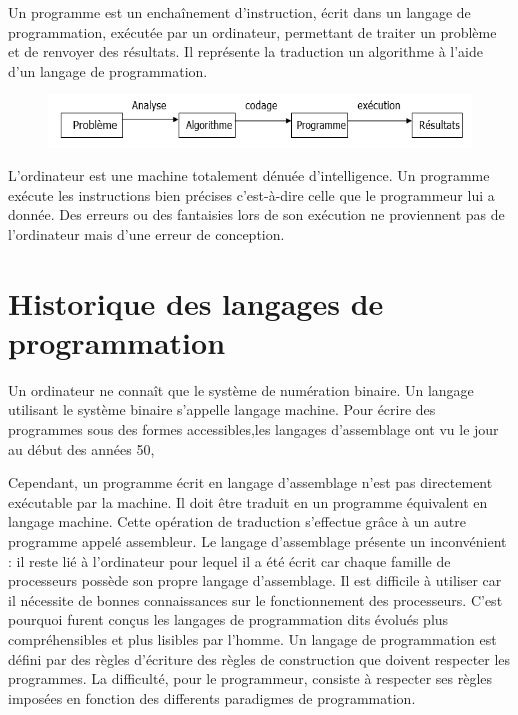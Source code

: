 \documentclass[a4paper,12pt]{article} %
\begin{document}
Un programme est un enchaînement d'instruction, écrit dans un langage de programmation, exécutée par un ordinateur, permettant de traiter un problème et de renvoyer des résultats. Il représente la traduction un algorithme à l'aide d'un langage de programmation.
\begin{figure}[h] %
  \centering %
  \includegraphics[scale=1]{img1.PNG} %
\end{figure}
L'ordinateur est une machine totalement dénuée d'intelligence. Un programme exécute les instructions bien précises c'est-à-dire celle que le programmeur lui a donnée. Des erreurs ou des fantaisies lors de son exécution ne proviennent pas de l'ordinateur mais d'une erreur de conception.

\section{Historique des langages de programmation} %

Un ordinateur ne connaît que le système de numération binaire. Un langage utilisant le système binaire s'appelle langage machine.
Pour écrire des programmes sous des formes accessibles,les langages d'assemblage ont vu le jour au début des années 50, 
 
Cependant, un programme écrit en langage d'assemblage n'est pas directement exécutable par la machine. Il doit être traduit en un programme équivalent en langage machine. Cette opération de traduction s'effectue grâce à un autre programme appelé assembleur.
Le langage d'assemblage présente un inconvénient : il reste lié à l'ordinateur pour lequel il a été écrit car chaque famille de processeurs possède son propre langage d'assemblage. Il est difficile à utiliser car il nécessite de bonnes connaissances sur le fonctionnement des processeurs.
C'est pourquoi furent conçus les langages de programmation dits évolués plus compréhensibles et plus lisibles par l'homme.
Un langage de programmation est défini par des règles d'écriture des règles de construction que doivent respecter les programmes. La difficulté, pour le programmeur, consiste à respecter ses règles imposées en fonction des differents paradigmes de programmation.
\end{document}
